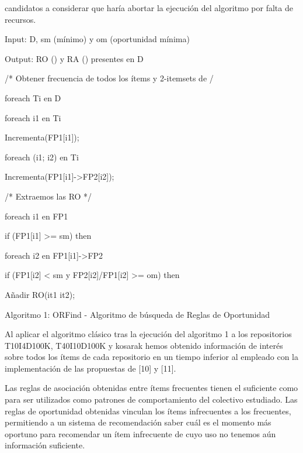 
candidatos
a considerar que haría abortar la ejecución
del algoritmo por falta de recursos.

Input: D, sm (\soporte mínimo) y om (oportunidad mínima)

Output: RO (\ROPs) y RA (\ARs) presentes en D

/* Obtener frecuencia de todos los ítems y 2-itemsets de \D */

foreach \transaccion Ti en D

foreach i1 en Ti {

Incrementa(FP1[i1]);

foreach (i1; i2) en Ti

Incrementa(FP1[i1]->FP2[i2]);

}

/* Extraemos las RO */

foreach i1 en FP1

if (FP1[i1] >= sm) then

foreach i2 en FP1[i1]->FP2

if (FP1[i2] < sm y FP2[i2]/FP1[i2]
>= om) then

Añadir RO(it1  it2);

Algoritmo 1: ORFind - Algoritmo de búsqueda de
Reglas de Oportunidad

Al aplicar el algoritmo clásico tras la ejecución del
algoritmo 1 a los repositorios T10I4D100K,
T40I10D100K y kosarak hemos obtenido información
de interés sobre todos los ítems de cada repositorio
en un tiempo inferior al empleado con la
implementación de las propuestas de [10] y [11].

Las reglas de asociación obtenidas entre ítems
frecuentes tienen el suficiente \soporte como para
ser utilizados como patrones de comportamiento
del colectivo estudiado. Las reglas de oportunidad
obtenidas vinculan los ítems infrecuentes a los
frecuentes, permitiendo a un sistema de recomendación
saber cuál es el momento más oportuno
para recomendar un ítem infrecuente de cuyo uso
no tenemos aún información suficiente.